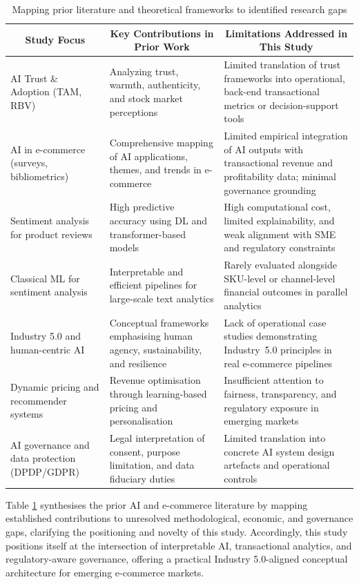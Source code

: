 \documentclass[authoryear,review,3p,times,12pt]{elsarticle}
\begin{document}
\begin{table}[htpb]
\centering
\renewcommand{\arraystretch}{1.15}
\caption{Mapping prior literature and theoretical frameworks to identified research gaps}
\label{tab:mapping_literature}
\begin{tabular}{p{4cm} p{5cm} p{6cm}}
\hline
\multicolumn{1}{c}{\textbf{Study Focus}} &
  \multicolumn{1}{c}{\textbf{Key   Contributions in Prior Work}} &
  \multicolumn{1}{c}{\textbf{Limitations Addressed in This Study}} \\ \hline
AI Trust \& Adoption (TAM, RBV) &
  Analyzing trust, warmth, authenticity, and stock market perceptions &
  Limited translation of trust frameworks into operational, back-end transactional metrics or decision-support tools \\
AI in e-commerce   (surveys, bibliometrics) &
  Comprehensive   mapping of AI applications, themes, and trends in e-commerce &
  Limited   empirical integration of AI outputs with transactional revenue and   profitability data; minimal governance grounding \\
Sentiment   analysis for product reviews &
  High predictive   accuracy using DL and transformer-based models &
  High   computational cost, limited explainability, and weak alignment with SME and   regulatory constraints \\
Classical ML for   sentiment analysis &
  Interpretable   and efficient pipelines for large-scale text analytics &
  Rarely   evaluated alongside SKU-level or channel-level financial outcomes in parallel analytics \\
Industry 5.0 and   human-centric AI &
  Conceptual   frameworks emphasising human agency, sustainability, and resilience &
  Lack of   operational case studies demonstrating Industry~5.0 principles in real   e-commerce pipelines \\
Dynamic pricing   and recommender systems &
  Revenue   optimisation through learning-based pricing and personalisation &
  Insufficient   attention to fairness, transparency, and regulatory exposure in emerging   markets \\
AI governance   and data protection (DPDP/GDPR) &
  Legal   interpretation of consent, purpose limitation, and data fiduciary duties &
  Limited   translation into concrete AI system design artefacts and operational controls \\ \hline
\end{tabular}
\end{table}

Table \ref{tab:mapping_literature} synthesises the prior AI and e-commerce literature by mapping established contributions to unresolved methodological, economic, and governance gaps, clarifying the positioning and novelty of this study. Accordingly, this study positions itself at the intersection of interpretable AI, transactional analytics, and regulatory-aware governance, offering a practical Industry 5.0-aligned conceptual architecture for emerging e-commerce markets.
\end{document}
